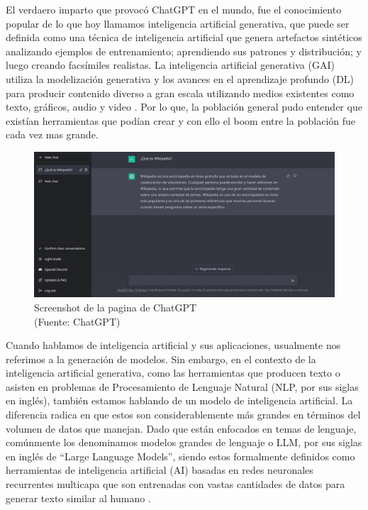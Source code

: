 \par El verdaero imparto que provocó ChatGPT en el mundo, fue el conocimiento popular de lo que hoy llamamos inteligencia 
artificial generativa, que puede ser definida como una técnica de inteligencia artificial que genera artefactos sintéticos analizando 
ejemplos de entrenamiento; aprendiendo sus patrones y distribución; y luego creando facsímiles realistas. La inteligencia 
artificial generativa (GAI) utiliza la modelización generativa y los avances en el aprendizaje profundo (DL) para producir 
contenido diverso a gran escala utilizando medios existentes como texto, gráficos, audio y video \cite{mt2}. Por lo que, la población 
general pudo entender que existían herramientas que podían crear y con ello el boom entre la población fue cada vez mas grande. 


\begin{figure}[ht!]
    \centering
    \includegraphics[width=.6\textwidth]{figures/ea2.png}
    \caption[Screenshot de la pagina de ChatGPT]{Screenshot de la pagina de ChatGPT \\
    {\scriptsize (Fuente: ChatGPT)}}

    \label{fig:ea2}
\end{figure}

\par Cuando hablamos de inteligencia artificial y sus aplicaciones, usualmente nos referimos a la generación de modelos. Sin embargo,
en el contexto de la inteligencia artificial generativa, como las herramientas que producen texto o asisten en problemas de 
Procesamiento de Lenguaje Natural (NLP, por sus siglas en inglés), también estamos hablando de un modelo de inteligencia 
artificial. La diferencia radica en que estos son considerablemente más grandes en términos del volumen de datos que manejan. 
Dado que están enfocados en temas de lenguaje, comúnmente los denominamos modelos grandes de lenguaje o LLM, por sus siglas 
en inglés de ``Large Language Models'', siendo estos formalmente definidos como herramientas de inteligencia artificial (AI) 
basadas en redes neuronales recurrentes multicapa que son entrenadas con vastas cantidades de datos para generar texto 
similar al humano \cite{mt6}.

